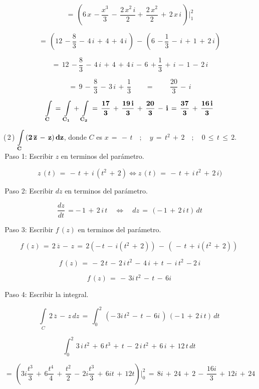 \documentclass[a4paper,11pt,openany]{book}
\begin{document}
$$=\,\left(6\,x\,-\dfrac{x^{3}}{3}\,-\,\dfrac{2\,x^{2}\,i}{2}+\,\dfrac{2\,x^{2}}{2}\,+\,2\,x\,i\,\right)\bigg|_{1}^{2}$$

$$=\,\left(12\,-\dfrac{8}{3}\,-\,4\,i\,+\,4\,+\,4\,i\,\right)\,-\,\left(6\,-\dfrac{1}{3}\,-\,i\,+\,1\,+\,2\,i\right)$$

$$=\,12\,-\dfrac{8}{3}\,-\,4\,i\,+\,4\,+\,4\,i\,-\,6\,+\dfrac{1}{3}\,+\,i\,-\,1\,-\,2\,i$$

$$=\,9\,-\,\dfrac{8}{3}\,-\,3\,i\,+\,\dfrac{1}{3} \qquad=\qquad\,\dfrac{20}{3}\,-\,i$$

$$\bf{\displaystyle\int\limits_{C}\,=\,\displaystyle\int\limits_{C_{1}}\,+\,\displaystyle\int\limits_{C_{2}}\,=\,\dfrac{17}{3}\,+\,\dfrac{19\,i}{3}\,+\,\dfrac{20}{3}\,-\,i\,=\,\dfrac{37}{3}\,+\,\dfrac{16\,i}{3}}$$

\textcolor{ao(english)}{(\,2\,)} $\bf{\displaystyle\int\limits_{C}\,(2\,\overline{z}\,-\,z)\,dz}$, \qquad donde \qquad $C$ es $x\,=\,-\,t \quad;\quad y\,=\,t^{2}\,+\,2 \quad;\quad 0\,\leq\,t\,\leq\,2$.\\

\textcolor{ao(english)}{\,Paso 1:} Escribir $z$ en terminos del parámetro.

$$z\,(t)\,=\,-\,t\,+\,i\,(t^{2}\,+\,2) \iff z\,(t)\,=\,-\,t\,+\,i\,t^{2}\,+\,2\,i)$$

\textcolor{ao(english)}{\,Paso 2:} Escribir $dz$ en terminos del parámetro.

$$\dfrac{dz}{dt}\,=-\,1\,+\,2\,i\,t \quad\iff\quad dz\,=\,(-\,1\,+\,2\,i\,t)\,dt$$

\textcolor{ao(english)}{\,Paso 3:} Escribir $f\,(z)$ en terminos del parámetro.

$$f\,(z)\,=\,2\,\overline{z}\,-\,z\,=\,2(-\,t\,-\,i(t^{2}\,+\,2))\,-\,(\,-\,t\,+\,i(t^{2}\,+\,2))\, $$

$$f\,(z)\,= \,-\,2\,t\,-\,2\,i\,t^{2}\,-\,4\,i\,+\,t\,-\,i\,t^{2}\,-2\,i  $$

$$f\,(z)\,= \,-\,3i\,t^{2}\,-\,t\,-\,6i\,  $$

\textcolor{ao(english)}{\,Paso 4:} Escribir la integral.

$$\displaystyle\int\limits_{C}\,2\,\overline{z}\,-\,z\,dz\,=\,\displaystyle\int_{0}^{2}\,(-\,3i\,t^{2}\,-\,t\,-\,6i\,)\,(-\,1\,+\,2\,i\,t)\,dt\,$$

$$\displaystyle\int_{0}^{2}\,3\,i\,t^{2}\,+\,6\,t^{3}\,+\,t\,-\,2\,i\,t^{2}\,+\,6\,i\,+\,12\,t\, dt\,$$

$$=\,\left(  3i\dfrac{t^{3}}{3}\,+\,6\dfrac{t^{4}}{4}\,+\,\dfrac{t^{2}}{2}\,-\,2i\dfrac{t^{3}}{3}\,+\,6it\,+\,12t\right)\bigg|_{0}^{2}\,=\,8i\,+\,24\,+\,2\,-\,\dfrac{16i}{3}\,+\,12i\,+\,24$$
\end{document}
